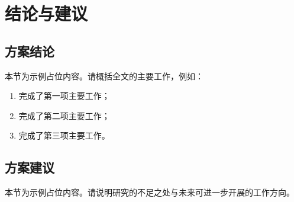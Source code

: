 \chapter{结论与建议}\label{chap:conclusion}

\section{方案结论}
本节为示例占位内容。请概括全文的主要工作，例如：
\begin{enumerate}[label={（\arabic*）},leftmargin=*]
  \item 完成了第一项主要工作；
  \item 完成了第二项主要工作；
  \item 完成了第三项主要工作。
\end{enumerate}

\section{方案建议}
本节为示例占位内容。请说明研究的不足之处与未来可进一步开展的工作方向。
